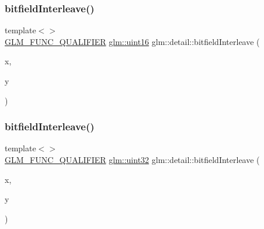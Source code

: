 \mbox{\label{namespaceglm_1_1detail_ac59c574dc7900d87786f5a96f82ea6e7}} 
\subsubsection{\texorpdfstring{bitfield\+Interleave()}{bitfieldInterleave()}\hspace{0.1cm}{\footnotesize\ttfamily [4/11]}}
{\footnotesize\ttfamily template$<$$>$ \\
\mbox{\hyperlink{setup_8hpp_a33fdea6f91c5f834105f7415e2a64407}{G\+L\+M\+\_\+\+F\+U\+N\+C\+\_\+\+Q\+U\+A\+L\+I\+F\+I\+ER}} \mbox{\hyperlink{group__gtc__type__precision_gad8c2939e1fdd8e5828b31d95c52255d5}{glm\+::uint16}} glm\+::detail\+::bitfield\+Interleave (\begin{DoxyParamCaption}\item[{\mbox{\hyperlink{group__gtc__type__precision_ga1a7dcd8aac97cc8020817c94049deff2}{glm\+::uint8}}}]{x,  }\item[{\mbox{\hyperlink{group__gtc__type__precision_ga1a7dcd8aac97cc8020817c94049deff2}{glm\+::uint8}}}]{y }\end{DoxyParamCaption})}

\mbox{\label{namespaceglm_1_1detail_ac5f2b38221d4447775e88f1b003f8113}} 
\subsubsection{\texorpdfstring{bitfield\+Interleave()}{bitfieldInterleave()}\hspace{0.1cm}{\footnotesize\ttfamily [5/11]}}
{\footnotesize\ttfamily template$<$$>$ \\
\mbox{\hyperlink{setup_8hpp_a33fdea6f91c5f834105f7415e2a64407}{G\+L\+M\+\_\+\+F\+U\+N\+C\+\_\+\+Q\+U\+A\+L\+I\+F\+I\+ER}} \mbox{\hyperlink{group__gtc__type__precision_ga202b6a53c105fcb7e531f9b443518451}{glm\+::uint32}} glm\+::detail\+::bitfield\+Interleave (\begin{DoxyParamCaption}\item[{\mbox{\hyperlink{group__gtc__type__precision_gad8c2939e1fdd8e5828b31d95c52255d5}{glm\+::uint16}}}]{x,  }\item[{\mbox{\hyperlink{group__gtc__type__precision_gad8c2939e1fdd8e5828b31d95c52255d5}{glm\+::uint16}}}]{y }\end{DoxyParamCaption})}

